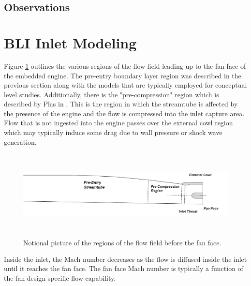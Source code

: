 \documentclass[12pt]{gatech-thesis}
\begin{document}
\subsection{Observations}
\vspace{25pt}


\section{BLI Inlet Modeling}
Figure \ref{Inlet_Diagram} outlines the various regions of the flow field leading up to the fan face of the embedded engine.  The pre-entry boundary layer region was described in the previous section along with the models that are typically employed for conceptual level studies.  Additionally, there is the "pre-compression" region which is described by Plas in \cite{PlasThesis}.  This is the region in which the streamtube is affected by the presence of the engine and the flow is compressed into the inlet capture area.  Flow that is not ingested into the engine passes over the external cowl region which may typically induce some drag due to wall pressure or shock wave generation.  
	\begin{figure}[htpb]
	\centering
	\includegraphics[width=160mm, height =45mm, clip=true]{Inlet_Diagram.png}
	\caption{Notional picture of the regions of the flow field before the fan face.}
	\label{Inlet_Diagram}
	\end{figure}
 Inside the inlet, the Mach number decreases as the flow is diffused inside the inlet until it reaches the fan face.  The fan face Mach number is typically a function of the fan design specific flow capability. 
\end{document}

